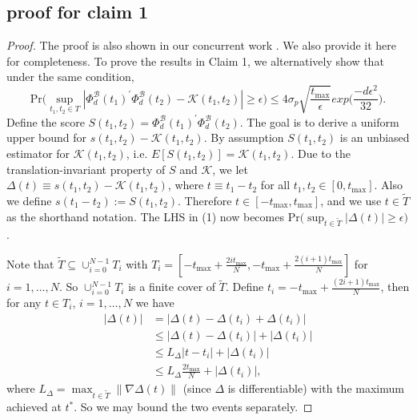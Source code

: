 \documentclass{article} %
\begin{document}
\subsection{proof for claim 1}
\begin{proof}
The proof is also shown in our concurrent work \cite{xu2019self}. We also provide it here for completeness. To prove the results in Claim 1, we alternatively show that under the same condition,
\begin{equation}
\label{eqn:appn0}
    \text{Pr}\big(\sup_{t_1,t_2 \in T}|\Phi^{\mathcal{B}}_d(t_1)^{'} \Phi^{\mathcal{B}}_d(t_2) - \mathcal{K}(t_1,t_2)| \geq \epsilon \big) \leq 4\sigma_p \sqrt{\frac{t_{\max}}{\epsilon}}exp\big(\frac{-d\epsilon^2}{32} \big).
\end{equation}
Define the score $S(t_1,t_2)=\Phi^{\mathcal{B}}_d(t_1)^{'}\Phi^{\mathcal{B}}_d(t_2)$. The goal is to derive a uniform upper bound for $s(t_1,t_2) - \mathcal{K}(t_1,t_2)$. By assumption $S(t_1,t_2)$ is an unbiased estimator for $\mathcal{K}(t_1,t_2)$, i.e. $E[S(t_1,t_2)] = \mathcal{K}(t_1,t_2)$. Due to the translation-invariant property of $S$ and $\mathcal{K}$, we let $\Delta(t) \equiv s(t_1,t_2) - \mathcal{K}(t_1,t_2)$, where $t \equiv t_1 - t_2$ for all $t_1,t_2 \in [0,t_{\max}]$. Also we define $s(t_1 - t_2 ):=S(t_1,t_2)$. Therefore $t \in [-t_{\max}, t_{\max}]$, and we use $t \in \tilde{T}$ as the shorthand notation. The LHS in (1) now becomes $\text{Pr}\big(\sup_{t \in \tilde{T}}|\Delta(t)| \geq \epsilon \big)$.

Note that $\tilde{T} \subseteq \cup_{i=0}^{N-1} T_i$ with $T_i = [-t_{\max} + \frac{2it_{\max}}{N}, -t_{\max} + \frac{2(i+1)t_{\max}}{N}]$ for $i=1,\ldots,N$. So $\cup_{i=0}^{N-1} T_i$ is a finite cover of $\tilde{T}$. Define $t_i = -t_{\max} + \frac{(2i+1)t_{\max}}{N}$, then for any $t \in T_i$, $ i=1,\ldots,N$ we have 
\begin{equation}
\label{eqn:appn2}
    \begin{split}
        |\Delta(t)| &= |\Delta(t) - \Delta(t_i) + \Delta(t_i)| \\
        & \leq |\Delta(t) - \Delta(t_i)| + |\Delta(t_i)| \\
        & \leq L_{\Delta}|t - t_i| + |\Delta(t_i)| \\
        & \leq L_{\Delta}\frac{2t_{\max}}{N} + |\Delta(t_i)|,
    \end{split}
\end{equation}
where $L_{\Delta} = \max_{t \in \tilde{T}} \|\nabla \Delta(t)\|$ (since $\Delta$ is differentiable) with the maximum achieved at $t^{*}$. So we may bound the two events separately. 


\end{proof}
\end{document}
